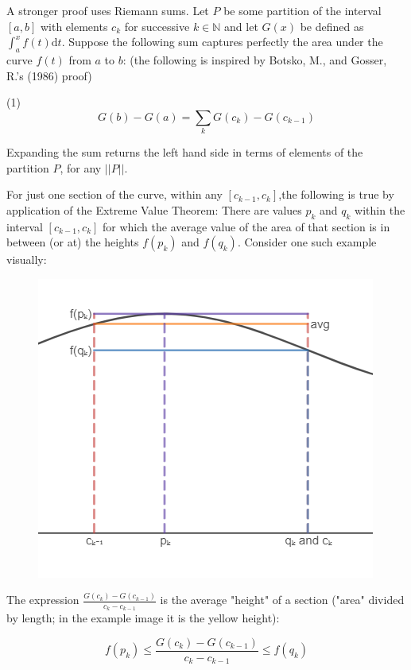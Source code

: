 \documentclass[11pt]{article}
\begin{document}
A stronger proof uses Riemann sums. Let $P$ be some partition of the interval $[a,b]$ with elements ${c_k}$ for successive $k\in\mathbb{N}$ and let $G(x)$ be defined as $\displaystyle{\int_{a}^{x}f(t)\mathrm{d}t}$. Suppose the following sum captures perfectly the area under the curve $f(t)$ from $a$ to $b$: (the following is inspired by Botsko, M., and  Gosser, R.'s (1986) proof) 

(1)$$G(b)-G(a) = \sum_k{G(c_k)-G(c_{k-1})}$$ %

Expanding the sum returns the left hand side in terms of elements of the partition $P$, for any $||P||$.\newpage

For just one section of the curve, within any $[c_{k-1},c_k]$,the following is true by application of the Extreme Value Theorem: There are values $p_k$ and $q_k$ within the interval $[c_{k-1},c_k]$ for which the average value of the area of that section is in between (or at) the heights $f(p_k)$ and $f(q_k)$. Consider one such example visually:

\begin{figure}[h]
\centering
\includegraphics[scale=0.75]{darboux}
\end{figure}

The expression $\displaystyle{\frac{G(c_k)-G(c_{k-1})}{c_k-c_{k-1}}}$ is the average "height" of a section ("area" divided by length; in the example image it is the yellow height):

$$f(p_k)\leq \frac{G(c_k)-G(c_{k-1})}{c_k-c_{k-1}}\leq f(q_k)$$
\end{document}
